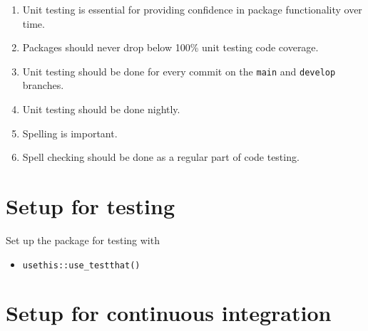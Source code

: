 \documentclass{article}
\begin{document}
\begin{enumerate}

  \item Unit testing is essential for providing confidence in package functionality over time.
  
  \item Packages should never drop below 100\% unit testing code coverage.
  
  \item Unit testing should be done for every commit on the \texttt{main} and \texttt{develop}
        branches.
		
  \item Unit testing should be done nightly.
  
  \item Spelling is important.
  
  \item Spell checking should be done as a regular part of code testing.

\end{enumerate}


\section{Setup for testing} 
\label{sec:testing_setup}

Set up the package for testing with

\begin{itemize}

  \item \verb|usethis::use_testthat()|

\end{itemize}


\section{Setup for continuous integration}
\label{sec:ci_setup}
\end{document}
